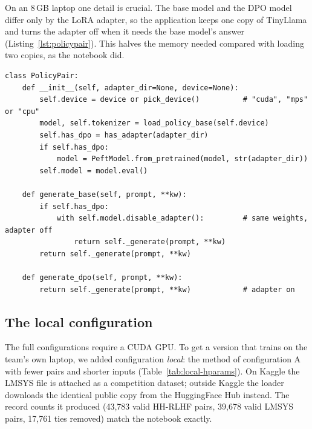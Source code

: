 On an 8\,GB laptop one detail is crucial. The base model and the DPO model differ only by the LoRA adapter, so the application keeps one copy of TinyLlama and turns the adapter off when it needs the base model's answer (Listing~\ref{lst:policypair}). This halves the memory needed compared with loading two copies, as the notebook did.

\begin{lstlisting}[caption={One TinyLlama copy serves both the base and the DPO model.}, label={lst:policypair}]
class PolicyPair:
    def __init__(self, adapter_dir=None, device=None):
        self.device = device or pick_device()          # "cuda", "mps" or "cpu"
        model, self.tokenizer = load_policy_base(self.device)
        self.has_dpo = has_adapter(adapter_dir)
        if self.has_dpo:
            model = PeftModel.from_pretrained(model, str(adapter_dir))
        self.model = model.eval()

    def generate_base(self, prompt, **kw):
        if self.has_dpo:
            with self.model.disable_adapter():         # same weights, adapter off
                return self._generate(prompt, **kw)
        return self._generate(prompt, **kw)

    def generate_dpo(self, prompt, **kw):
        return self._generate(prompt, **kw)            # adapter on
\end{lstlisting}

\subsection{The local configuration}
The full configurations require a CUDA GPU. To get a version that trains on the team's own laptop, we added configuration \emph{local}: the method of configuration A with fewer pairs and shorter inputs (Table~\ref{tab:local-hparams}). On Kaggle the LMSYS file is attached as a competition dataset; outside Kaggle the loader downloads the identical public copy from the HuggingFace Hub instead. The record counts it produced (43,783 valid HH-RLHF pairs, 39,678 valid LMSYS pairs, 17,761 ties removed) match the notebook exactly.

